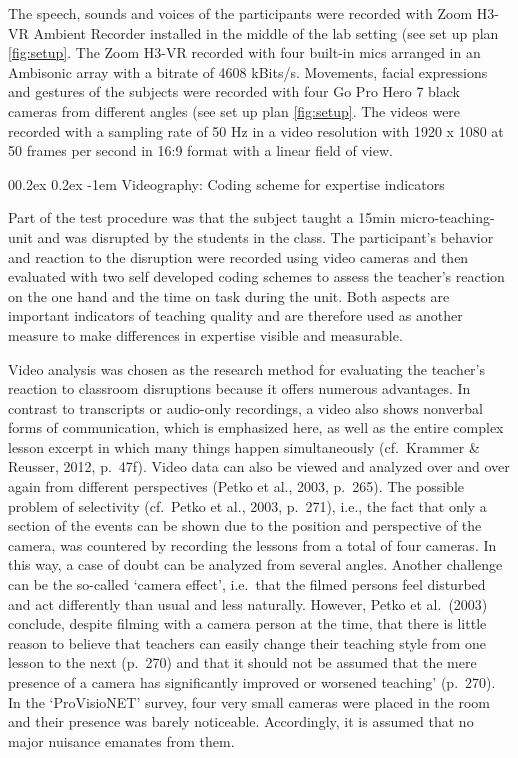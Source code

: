 \documentclass[
  man]{apa6}
\makeatletter
\let\oldparagraph\paragraph
\renewcommand{\paragraph}[1]{\oldparagraph{#1}\mbox{}}
\renewcommand{\paragraph}{\@startsection{paragraph}{4}{\parindent}%
  {0\baselineskip \@plus 0.2ex \@minus 0.2ex}%
  {-1em}%
  {\normalfont\normalsize\bfseries\itshape\typesectitle}}
\makeatother
\begin{document}
The speech, sounds and voices of the participants were recorded with Zoom H3-VR Ambient Recorder installed in the middle of the lab setting (see set up plan \ref{fig:setup}. The Zoom H3-VR recorded with four built-in mics arranged in an Ambisonic array with a bitrate of 4608 kBits/s. Movements, facial expressions and gestures of the subjects were recorded with four Go Pro Hero 7 black cameras from different angles (see set up plan \ref{fig:setup}. The videos were recorded with a sampling rate of 50 Hz in a video resolution with 1920 x 1080 at 50 frames per second in 16:9 format with a linear field of view.

\hypertarget{videography-coding-scheme-for-expertise-indicators}{%
\paragraph{Videography: Coding scheme for expertise indicators}\label{videography-coding-scheme-for-expertise-indicators}}

Part of the test procedure was that the subject taught a 15min micro-teaching-unit and was disrupted by the students in the class. The participant's behavior and reaction to the disruption were recorded using video cameras and then evaluated with two self developed coding schemes to assess the teacher's reaction on the one hand and the time on task during the unit. Both aspects are important indicators of teaching quality and are therefore used as another measure to make differences in expertise visible and measurable.

Video analysis was chosen as the research method for evaluating the teacher's reaction to classroom disruptions because it offers numerous advantages. In contrast to transcripts or audio-only recordings, a video also shows nonverbal forms of communication, which is emphasized here, as well as the entire complex lesson excerpt in which many things happen simultaneously (cf.~Krammer \& Reusser, 2012, p.~47f). Video data can also be viewed and analyzed over and over again from different perspectives (Petko et al., 2003, p.~265). The possible problem of selectivity (cf.~Petko et al., 2003, p.~271), i.e., the fact that only a section of the events can be shown due to the position and perspective of the camera, was countered by recording the lessons from a total of four cameras. In this way, a case of doubt can be analyzed from several angles. Another challenge can be the so-called `camera effect', i.e.~that the filmed persons feel disturbed and act differently than usual and less naturally. However, Petko et al.~(2003) conclude, despite filming with a camera person at the time, that there is little reason to believe that teachers can easily change their teaching style from one lesson to the next (p.~270) and that it should not be assumed that the mere presence of a camera has significantly improved or worsened teaching' (p.~270). In the `ProVisioNET' survey, four very small cameras were placed in the room and their presence was barely noticeable. Accordingly, it is assumed that no major nuisance emanates from them.
\end{document}
